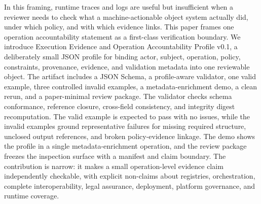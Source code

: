In this framing, runtime traces and logs are useful but insufficient when a
reviewer needs to check what a machine-actionable object system actually did,
under which policy, and with which evidence links. This paper frames one
operation accountability statement as a first-class verification boundary. We
introduce Execution Evidence and Operation Accountability Profile v0.1, a
deliberately small JSON profile for binding actor, subject, operation, policy,
constraints, provenance, evidence, and validation metadata into one reviewable
object. The artifact includes a JSON Schema, a profile-aware validator, one
valid example, three controlled invalid examples, a metadata-enrichment demo, a
clean rerun, and a paper-minimal review package. The validator checks schema
conformance, reference closure, cross-field consistency, and integrity digest
recomputation. The valid example is expected to pass with no issues, while the
invalid examples ground representative failures for missing required structure,
unclosed output references, and broken policy-evidence linkage. The demo shows
the profile in a single metadata-enrichment operation, and the review package
freezes the inspection surface with a manifest and claim boundary. The
contribution is narrow: it makes a small operation-level evidence claim
independently checkable, with explicit non-claims about registries,
orchestration, complete interoperability, legal assurance, deployment, platform
governance, and runtime coverage.
